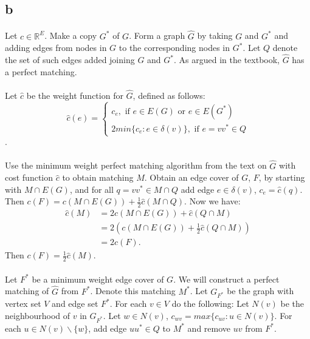 \documentclass[letterpaper,12pt,oneside,onecolumn]{report}
\begin{document}
\subsection*{b}
\paragraph{}
Let $c \in \mathbb{R}^E$. Make a copy $G^*$ of $G$. Form a graph $\hat{G}$ by taking $G$ and $G^*$ and adding edges from nodes in $G$ to the corresponding nodes in $G^*$. Let $Q$ denote the set of such edges added joining $G$ and $G^*$. As argued in the textbook, $\hat{G}$ has a perfect matching.
\paragraph{}
Let $\hat{c}$ be the weight function for $\hat{G}$, defined as follows: 
$$
\hat{c}(e) = 
\begin{cases}
c_e, \text{ if $e \in E(G)$ or $e \in E(G^*)$}\\
2min\{c_e : e \in \delta(v)\}, \text{ if $e=vv^* \in Q$}
\end{cases}
$$.
\paragraph{}
Use the minimum weight perfect matching algorithm from the text on $\hat{G}$ with cost function $\hat{c}$ to obtain matching $M$. Obtain an edge cover of $G$, $F$, by starting with $M \cap E(G)$, and for all $q=vv^* \in M\cap Q$ add edge $e \in \delta(v)$, $c_e = \hat{c}(q)$. Then $c(F) = c(M\cap E(G)) + \frac{1}{2}\hat{c}(M \cap Q)$. Now we have:
\begin{align*}
\hat{c}(M) &= 2c(M \cap E(G)) + \hat{c}(Q \cap M) \\
&= 2(c(M \cap E(G)) + \frac{1}{2}\hat{c}(Q\cap M)) \\
&= 2c(F).
\end{align*}
Then $c(F) = \frac{1}{2}\hat{c}(M)$.
\paragraph{}
Let $F^*$ be a minimum weight edge cover of $G$. We will construct a perfect matching of $\hat{G}$ from $F^*$. Denote this matching $M^*$. Let $G_{F^*}$ be the graph with vertex set $V$ and edge set $F^*$. For each $v \in V$ do the following: Let $N(v)$ be the neighbourhood of $v$ in $G_{F^*}$. Let $w \in N(v)$, $c_{wv} = max\{c_{uv} : u \in N(v)\}$. For each $u \in N(v) \backslash \{w\}$, add edge $uu^* \in Q$ to $M^*$ and remove $uv$ from $F^*$.
\end{document}
